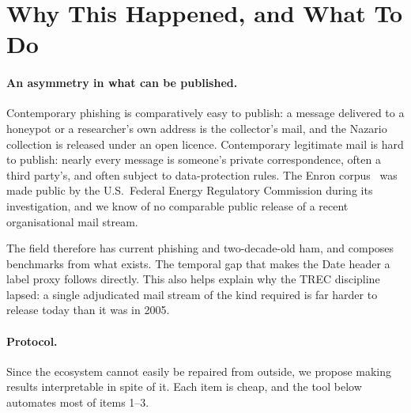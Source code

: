 \documentclass[twoside,11pt]{article}
\begin{document}
\section{Why This Happened, and What To Do}
\label{sec:protocol}

\paragraph{An asymmetry in what can be published.}
Contemporary phishing is comparatively easy to publish: a message delivered
to a honeypot or a researcher's own address is the collector's mail, and the
Nazario collection is released under an open licence. Contemporary legitimate
mail is hard to publish: nearly every message is someone's private
correspondence, often a third party's, and often subject to data-protection
rules. The Enron corpus~\citep{klimt2004} was made public by the U.S.\ Federal
Energy Regulatory Commission during its investigation, and we know of no
comparable public release of a recent organisational mail stream.

The field therefore has current phishing and two-decade-old ham, and composes
benchmarks from what exists. The temporal gap that makes the Date header a
label proxy follows directly. This also helps explain why the TREC discipline
lapsed: a single adjudicated mail stream of the kind \citet{cormack2005}
required is far harder to release today than it was in 2005.

\paragraph{Protocol.}
Since the ecosystem cannot easily be repaired from outside, we propose making
results interpretable in spite of it. Each item is cheap, and the tool below
automates most of items 1--3.
\end{document}
